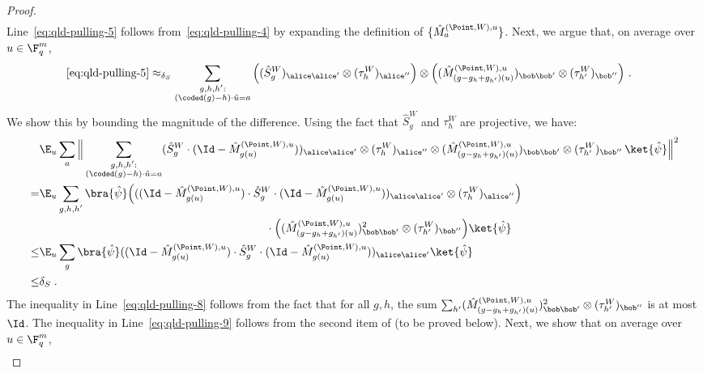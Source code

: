 \begin{proof}
\begin{align}
\end{align}
	Line~\eqref{eq:qld-pulling-5} follows from~\eqref{eq:qld-pulling-4} by expanding the definition of $\{ \hat{M}^{(\Point,W),u}_a\}$. Next, we argue that, on average over $u \in \F_q^m$,
\begin{align}
		\text{\eqref{eq:qld-pulling-5}} &\approx_{\delta_S} \sum_{\substack{g,h,h': \\ (\coded(g)-h)\cdot \tilde{u} = a}} \Big((\hat{S}^W_g)_{\alice \alice'} \otimes (\tau_h^W)_{\alice''} \Big) \otimes \Big( (\hat{M}^{(\Point,W),u}_{(g-g_h+g_{h'})(u)})_{\bob \bob'} \otimes (\tau_{h'}^W)_{\bob''} \Big)~. \label{eq:qld-pulling-7}
		\end{align}
		We show this by bounding the magnitude of the difference. Using the fact that $\hat{S}^W_g$ and $\tau^W_h$ are projective, we have:
		\begin{align}
		&\E_u \sum_a \Big \|\sum_{\substack{g,h,h': \\ (\coded(g)-h)\cdot \tilde{u} = a}} (\hat{S}^W_g \cdot (\Id - \hat{M}^{(\Point,W),u}_{g(u)}))_{\alice \alice'} \otimes (\tau_h^W)_{\alice''} \otimes (\hat{M}^{(\Point,W),u}_{(g-g_h+g_{h'})(u)})_{\bob \bob'} \otimes (\tau_{h'}^W)_{\bob''} \, \ket{\hat{\psi}} \Big \|^2 \notag \\
      =& \E_u \sum_{\substack{g,h,h'}} \bra{\hat{\psi}} \Big(((\Id - \hat{M}^{(\Point,W),u}_{g(u)}) \cdot \hat{S}^W_g \cdot (\Id - \hat{M}^{(\Point,W),u}_{g(u)}))_{\alice \alice'} \otimes (\tau_h^W)_{\alice''} \Big) \notag \\
      & \hspace{20em} \cdot \Big( (\hat{M}^{(\Point,W),u}_{(g-g_h+g_{h'})(u)})^2_{\bob \bob'} \otimes (\tau_{h'}^W)_{\bob''} \Big) \ket{\hat{\psi}} \notag \\
		\leq& \E_u \sum_{g} \bra{\hat{\psi}} ((\Id - \hat{M}^{(\Point,W),u}_{g(u)}) \cdot \hat{S}^W_g \cdot (\Id - \hat{M}^{(\Point,W),u}_{g(u)}))_{\alice \alice'} \ket{\hat{\psi}}\label{eq:qld-pulling-8} \\
		\leq& \delta_S\;. \label{eq:qld-pulling-9}
		\end{align}
		The inequality in Line~\eqref{eq:qld-pulling-8} follows from the fact that for all $g,h$, the sum $\sum_{h'} (\hat{M}^{(\Point,W),u}_{(g-g_h+g_{h'})(u)})^2_{\bob \bob'} \otimes (\tau_{h'}^W)_{\bob''}$ is at most $\Id$. The inequality in Line~\eqref{eq:qld-pulling-9} follows from the second item of  (to be proved below). 
		Next, we show that on average over $u \in \F_q^m$,
		\begin{align}

\end{align}
\end{proof}
